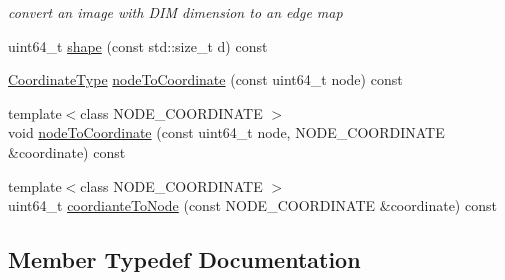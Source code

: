 \begin{DoxyCompactItemize}
\begin{DoxyCompactList}\small\item\em convert an image with D\+IM dimension to an edge map \end{DoxyCompactList}\item 
uint64\+\_\+t \hyperlink{classnifty_1_1graph_1_1UndirectedGridGraph_3_01DIM_00_01true_01_4_a206b74a50e85536e1adcb973a462b948}{shape} (const std\+::size\+\_\+t d) const
\item 
\hyperlink{classnifty_1_1graph_1_1UndirectedGridGraph_3_01DIM_00_01true_01_4_a45f38cce72559c7bdefa3d219486bae4}{Coordinate\+Type} \hyperlink{classnifty_1_1graph_1_1UndirectedGridGraph_3_01DIM_00_01true_01_4_a4ef30ed981eacce6fa7df7e3fafcdf46}{node\+To\+Coordinate} (const uint64\+\_\+t node) const
\item 
{\footnotesize template$<$class N\+O\+D\+E\+\_\+\+C\+O\+O\+R\+D\+I\+N\+A\+TE $>$ }\\void \hyperlink{classnifty_1_1graph_1_1UndirectedGridGraph_3_01DIM_00_01true_01_4_aaeddd017b04ed56d66c0626b0919b664}{node\+To\+Coordinate} (const uint64\+\_\+t node, N\+O\+D\+E\+\_\+\+C\+O\+O\+R\+D\+I\+N\+A\+TE \&coordinate) const
\item 
{\footnotesize template$<$class N\+O\+D\+E\+\_\+\+C\+O\+O\+R\+D\+I\+N\+A\+TE $>$ }\\uint64\+\_\+t \hyperlink{classnifty_1_1graph_1_1UndirectedGridGraph_3_01DIM_00_01true_01_4_a232a767bec4c9a0cf9fb4e9a14945112}{coordiante\+To\+Node} (const N\+O\+D\+E\+\_\+\+C\+O\+O\+R\+D\+I\+N\+A\+TE \&coordinate) const
\end{DoxyCompactItemize}


\subsection{Member Typedef Documentation}
\mbox{\label{classnifty_1_1graph_1_1UndirectedGridGraph_3_01DIM_00_01true_01_4_a9779969eb8762908d43eab3d9d3b17b1}} 
